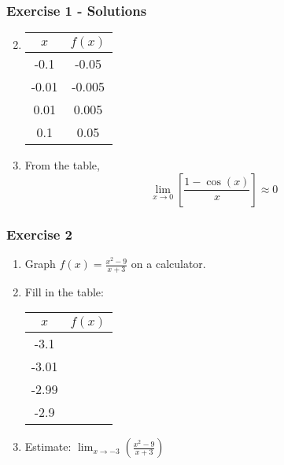 \documentclass[12pt]{beamer}
\begin{document}
\begin{frame}
	\frametitle{Exercise 1 - Solutions} %
	\begin{multicols}{2}
		\begin{enumerate}
			\setcounter{enumi}{1}
			\large

			\item
			\begin{table}[]
				\begin{tabular}{c|c}
					$x$   & $f(x)$ \\ \hline
					-0.1  & -0.05  \\
					-0.01 & -0.005 \\
					0.01  & 0.005  \\
					0.1   & 0.05
				\end{tabular}
			\end{table}
			\item From the table, \[\displaystyle\lim_{x\to 0}\left[\frac{1-\cos(x)}{x}\right]\approx \boxed{0}\]
		\end{enumerate}
	\end{multicols}
\end{frame}
\begin{frame}
	\frametitle{Exercise 2}
	\initclock
	\large
	\begin{enumerate}
		\item Graph $f(x) = \frac{x^2-9}{x+3}$ on a calculator.
		\vspace*{\fill}
		\vspace*{\fill}
		\item Fill in the table:
		\small
		\begin{table}[]
			\begin{tabular}{c|c}
				$x$   & $f(x)$ \\ \hline
				-3.1  &        \\
				-3.01 &        \\
				-2.99 &        \\
				-2.9  &
			\end{tabular}
		\end{table}
		\large
		\vspace*{\fill}
		\vspace*{\fill}
		\item Estimate: $\displaystyle\lim_{x\to -3}\left(\frac{x^2-9}{x+3}\right)$
	\end{enumerate}
	\vspace*{\fill}
	\vspace*{\fill}
	\vspace*{\fill}
	\vspace*{\fill}
	\crono
\end{frame}
\end{document}
